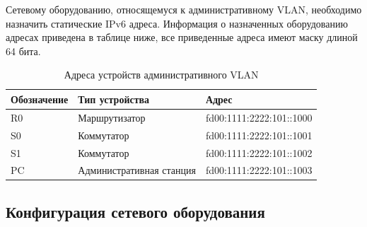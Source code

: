     Сетевому оборудованию, относящемуся к административному VLAN, необходимо назначить статические IPv6 адреса.
    Информация о назначенных оборудованию адресах приведена в таблице ниже, все приведенные адреса имеют маску длиной 64 бита.
    \begin{longtable}{| >{\raggedright}m{}
                | >{\centering\arraybackslash}m{}
                | >{\centering\arraybackslash}m{}|}
    \caption{Адреса устройств административного VLAN} \label{table:func:AdminV6VLAN} \\
    \hline
    \centering\arraybackslash Обозначение
    & \centering\arraybackslash Тип устройства
    & \centering\arraybackslash Адрес\\
    \hline
    \endhead
    R0 &
    Маршрутизатор &
    fd00:1111:2222:101::1000
    \\
    \hline
    S0 &
    Коммутатор &
    fd00:1111:2222:101::1001
    \\
    \hline
    S1 &
    Коммутатор &
    fd00:1111:2222:101::1002
    \\
    \hline
    PC &
    Административная станция &
    fd00:1111:2222:101::1003
    \\
    \hline
    \end{longtable}


\subsection{Конфигурация сетевого оборудования}\label{subsec:func:DevicesConfig}

